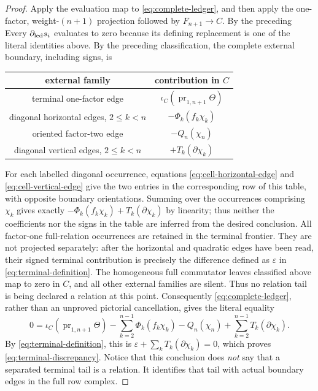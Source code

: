 \documentclass[11pt]{amsart}
\theoremstyle{remark}
\newcommand{\pr}{\operatorname{pr}}
\begin{document}
\begin{proof}
	Apply the evaluation map to \eqref{eq:complete-ledger}, and then apply
	the one-factor,
	weight-$(n+1)$ projection followed by $F_{n+1}\to C$.  By the preceding
	Every $\partial_{\rm led}s_i$ evaluates to zero because its defining
	replacement is one of the literal identities above.  By the preceding
	classification, the complete external boundary, including signs, is
	\begin{center}
	\begin{tabular}{c|c}
	 external family & contribution in $C$ \\ \hline
	 terminal one-factor edge &
	 $\iota_C(\pr_{1,n+1}\Theta)$ \\
	 diagonal horizontal edges, $2\leq k<n$ &
	 $-\Phi_k(f_k\chi_k)$ \\
	 oriented factor-two edge & $-Q_n(\chi_n)$ \\
	 diagonal vertical edges, $2\leq k<n$ &
	 $+T_k(\partial\chi_k)$
	\end{tabular}
	\end{center}
	For each labelled diagonal occurrence, equations
	\eqref{eq:cell-horizontal-edge} and
	\eqref{eq:cell-vertical-edge} give the two entries in the corresponding
	row of this table, with opposite boundary orientations.  Summing over
	the occurrences comprising $\chi_k$ gives exactly
	$-\Phi_k(f_k\chi_k)+T_k(\partial\chi_k)$ by linearity; thus neither the
	coefficients nor the signs in the table are inferred from the desired
	conclusion.
	All factor-one full-relation occurrences are retained in the terminal
	frontier.  They are not projected separately: after the horizontal and
	quadratic edges have been read, their signed terminal contribution is
	precisely the difference defined as $\varepsilon$ in
	\eqref{eq:terminal-definition}.  The homogeneous full commutator leaves
	classified above map to zero in $C$, and all other external families are
	silent.  Thus no relation tail is being declared a relation at this
	point.
	Consequently \eqref{eq:complete-ledger}, rather than an unproved
	pictorial cancellation, gives the literal equality
	\begin{equation}\label{eq:evaluated-complete-ledger}
	 0=\iota_C(\pr_{1,n+1}\Theta)
	   -\sum_{k=2}^{n-1}\Phi_k(f_k\chi_k)-Q_n(\chi_n)
	   +\sum_{k=2}^{n-1}T_k(\partial\chi_k).
	\end{equation}
	By \eqref{eq:terminal-definition}, this is
	$\varepsilon+\sum_kT_k(\partial\chi_k)=0$, which proves
	\eqref{eq:terminal-discrepancy}.  Notice that this conclusion does
	\emph{not} say that a separated terminal tail is a relation.  It
	identifies that tail with actual boundary edges in the full row complex.


\end{proof}
\end{document}
